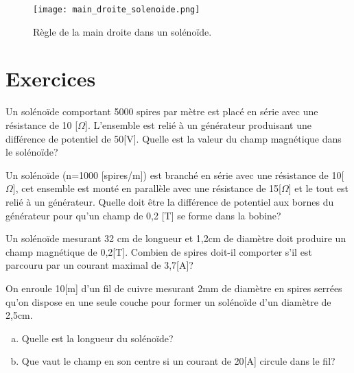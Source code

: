 \begin{figure}[ht]
    \centering
    \texttt{[image: main\_droite\_solenoide.png]}
    \caption{Règle de la main droite dans un solénoïde.}
    \label{main_droite_solenoide}
\end{figure}

\newpage

\section{Exercices}
\begin{exercise}
    Un solénoïde comportant 5000 spires par mètre est placé en série avec une résistance de 10 [\(\Omega\)]. L'ensemble est relié à un générateur produisant une différence de potentiel de 50[V]. Quelle est la valeur du champ magnétique dans le solénoïde?
\end{exercise}

\begin{exercise}
    Un solénoïde (n=1000 [spires/m]) est branché en série avec une résistance de 10[\(\Omega\)], cet ensemble est monté en parallèle avec une résistance de 15[\(\Omega\)] et le tout est relié à un générateur. Quelle doit être la différence de potentiel aux bornes du générateur pour qu'un champ de 0,2 [T] se forme dans la bobine?
\end{exercise}

\begin{exercise}
    Un solénoïde mesurant 32 cm de longueur et 1,2cm de diamètre doit produire un champ magnétique de 0,2[T]. Combien de spires doit-il comporter s'il est parcouru par un courant maximal de 3,7[A]?
\end{exercise}

\begin{exercise}
    On enroule 10[m] d'un fil de cuivre mesurant 2mm de diamètre en spires serrées qu'on dispose en une seule couche pour former un solénoïde d'un diamètre de 2,5cm.
    \begin{enumerate}[a)]
        \item Quelle est la longueur du solénoïde?
        \item Que vaut le champ en son centre si un courant de 20[A] circule dans le fil?
    \end{enumerate}
\end{exercise}






